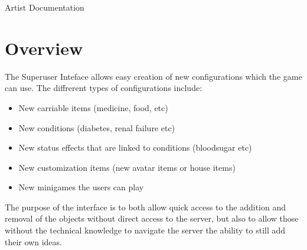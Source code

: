 \documentclass[a4paper,12pt]{article}
\begin{document}
\begin{center}
{\Huge Artist Documentation}
\end{center}

\section{Overview}

The Superuser Inteface allows easy creation of new configurations which the game can use.
The diffrerent types of configurations include:
\begin{itemize}
	\item New carriable items (medicine, food, etc)
	\item New conditions (diabetes, renal failure etc)
	\item New status effects that are linked to conditions (bloodsugar etc)
	\item New customization items (new avatar items or house items)
	\item New minigames the users can play
\end{itemize}

The purpose of the interface is to both allow quick access to the addition and removal of the objects without
direct access to the server, but also to allow those without the technical knowledge to navigate the server the
ability to still add their own ideas.
\end{document}
